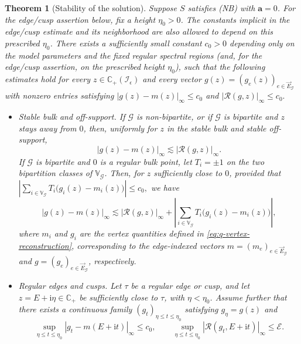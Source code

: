 \documentclass[11pt,twoside, a4paper]{article}
\numberwithin{equation}{section}
\numberwithin{figure}{section}
\theoremstyle{plain} %
\newtheorem{theorem}{Theorem}[section]
\theoremstyle{definition}
\theoremstyle{remark}
\newcommand{\1} {\mspace{1 mu}}
\newcommand{\2} {\mspace{2 mu}}
\newcommand{\Cp} {\mathbb {C}_+}
\begin{document}
\begin{theorem}[Stability of the solution]\label{lem.stability2}
Suppose $S$ satisfies (NB) with $\mathbf a=0$.
For the edge/cusp assertion below, fix a height $\eta_0>0$.
The constants implicit in the edge/cusp estimate and its neighborhood are also
allowed to depend on this prescribed $\eta_0$.
There exists a sufficiently small constant $c_0>0$
depending only on the model parameters and the fixed regular spectral regions
(and, for the edge/cusp assertion, on the prescribed height $\eta_0$),
such that the following estimates hold for every
$z\in\Cp(\mathcal I_\epsilon)$ and every vector
$g(z)=(g_e(z))_{e\in\vec E_{\mathcal G}}$
with nonzero entries satisfying
$
    |g(z)-m(z)|_\infty\le c_0$ and $
    |\mathcal R(g,z)|_\infty\le c_0.
$
\begin{itemize}
\item
\emph{Stable bulk and off-support.}
If $\mathcal G$ is non-bipartite, or if $\mathcal G$ is bipartite and $z$ stays
away from $0$, then, uniformly for $z$ in the stable bulk and stable
off-support, 
\begin{equation}
\label{eq:nonlinear-bulk-stability}
|g(z)-m(z)|_\infty
\lesssim
|\mathcal{R}(g,z)|_\infty.
\end{equation}
If $\mathcal G$ is bipartite and $0$ is a regular bulk point, let
$T_i=\pm1$ on the two bipartition classes of $\mathbb V_{\mathcal G}$.
Then, for $z$ sufficiently close to $0$, provided that
$
\left|
\sum_{i\in\mathbb V_{\mathcal G}}T_i
\bigl(g_i(z)-m_i(z)\bigr)
\right|
\le c_0,
$
we have
\begin{equation}
\label{eq.bulk-0-stability}
|g(z)-m(z)|_\infty
\lesssim
|\mathcal{R}(g,z)|_\infty
+
\left|
\sum_{i\in\mathbb{V}_{\mathcal G}}T_i
\bigl(g_i(z)-m_i(z)\bigr)
\right|,
\end{equation}
where $m_i$ and $g_i$ are the vertex quantities defined in
\eqref{eq:q-vertex-reconstruction}, corresponding to the edge-indexed
vectors $m=(m_e)_{e\in\vec E_{\mathcal G}}$ and
$g=(g_e)_{e\in\vec E_{\mathcal G}}$, respectively.
\item
\emph{Regular edges and cusps.}
Let $\tau$ be a regular edge or cusp, and let
$z=E+\mathrm i\eta\in\Cp$ be sufficiently close
to $\tau$, with $\eta<\eta_0$.
Assume further that there exists a continuous family
$(g_t)_{\eta\le t\le\eta_0}$ satisfying
$g_\eta=g(z)$ and
\begin{equation}\label{eq.continuity}
\sup_{\eta\le t\le\eta_0}
|g_t-m(E+\mathrm i t)|_\infty\le c_0,
\qquad
\sup_{\eta\le t\le\eta_0}
|\mathcal{R}(g_t,E+\mathrm i t)|_\infty\le\mathcal{E}.

\end{equation}
\end{itemize}
\end{theorem}
\end{document}
